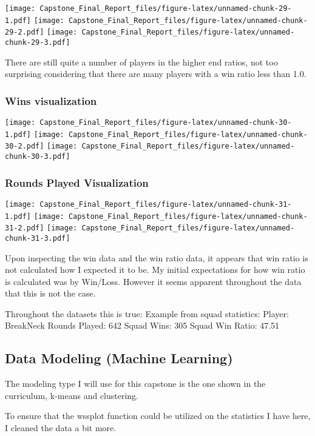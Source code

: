 \documentclass[]{article}
\begin{document}
\texttt{[image: Capstone\_Final\_Report\_files/figure-latex/unnamed-chunk-29-1.pdf]}
\texttt{[image: Capstone\_Final\_Report\_files/figure-latex/unnamed-chunk-29-2.pdf]}
\texttt{[image: Capstone\_Final\_Report\_files/figure-latex/unnamed-chunk-29-3.pdf]}

There are still quite a number of players in the higher end ratios, not
too surprising considering that there are many players with a win ratio
less than 1.0.

\subsubsection{Wins visualization}\label{wins-visualization}

\texttt{[image: Capstone\_Final\_Report\_files/figure-latex/unnamed-chunk-30-1.pdf]}
\texttt{[image: Capstone\_Final\_Report\_files/figure-latex/unnamed-chunk-30-2.pdf]}
\texttt{[image: Capstone\_Final\_Report\_files/figure-latex/unnamed-chunk-30-3.pdf]}

\subsubsection{Rounds Played
Visualization}\label{rounds-played-visualization}

\texttt{[image: Capstone\_Final\_Report\_files/figure-latex/unnamed-chunk-31-1.pdf]}
\texttt{[image: Capstone\_Final\_Report\_files/figure-latex/unnamed-chunk-31-2.pdf]}
\texttt{[image: Capstone\_Final\_Report\_files/figure-latex/unnamed-chunk-31-3.pdf]}

Upon inspecting the win data and the win ratio data, it appears that win
ratio is not calculated how I expected it to be. My initial expectations
for how win ratio is calculated was by Win/Loss. However it seems
apparent throughout the data that this is not the case.

Throughout the datasets this is true: Example from squad statistics:
Player: BreakNeck Rounds Played: 642 Squad Wins: 305 Squad Win Ratio:
47.51

\subsection{Data Modeling (Machine
Learning)}\label{data-modeling-machine-learning}

The modeling type I will use for this capstone is the one shown in the
curriculum, k-means and clustering.

To ensure that the wssplot function could be utilized on the statistics
I have here, I cleaned the data a bit more.
\end{document}
